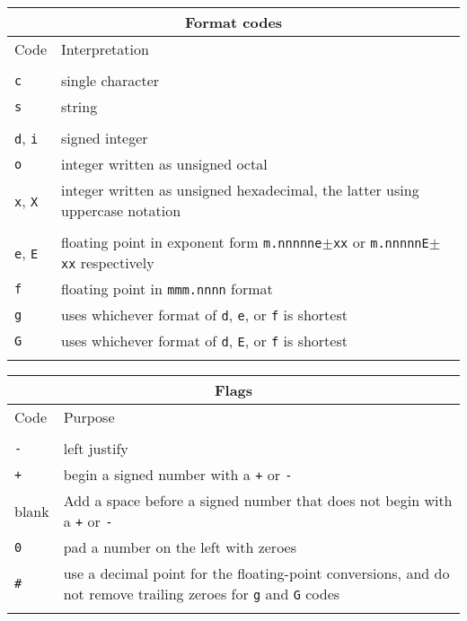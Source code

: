 \begin{minipage}{75mm}
\vspace*{3mm}
\begin{tabular}{lp{61mm}}
\hline
\multicolumn{2}{c}{Format codes} \\ \hline
Code & Interpretation \\ \hline
\vspace*{-\medskipamount} \\
{\tt c} & single character \\
{\tt s} & string \\
\\
{\tt d}, {\tt i} & signed integer \\
{\tt o} & integer written as unsigned octal \\
{\tt x}, {\tt X} & integer written as unsigned hexadecimal, the
           latter using uppercase notation \\
\\
{\tt e}, {\tt E} & floating point in exponent form {\tt m.nnnnne$\pm$xx}
                       or {\tt m.nnnnnE$\pm$xx} respectively \\
{\tt f} & floating point in {\tt mmm.nnnn} format\\
{\tt g} & uses whichever format of {\tt d}, {\tt e}, or {\tt f}
          is shortest \\ 
{\tt G} & uses whichever format of {\tt d}, {\tt E}, or {\tt f}
          is shortest \\ 
\vspace*{-\medskipamount} \\ \hline
\end{tabular}

\vspace*{10mm}
\begin{tabular}{lp{61mm}}
\hline
\multicolumn{2}{c}{Flags} \\ \hline
Code & Purpose \\ \hline
\vspace*{-\medskipamount} \\
{\tt -} & left justify \\
{\tt +} & begin a signed number with a {\tt +} or {\tt -} \\
blank & Add a space before a signed number that does not begin with a
          {\tt +} or {\tt -} \\
{\tt 0} & pad a number on the left with zeroes \\
{\tt \#} & use a decimal point for the floating-point conversions, and
do not remove trailing zeroes for {\tt g} and {\tt G} codes \\
\vspace*{-\medskipamount} \\ \hline
\end{tabular}

\end{minipage}
\vspace*{2mm}


